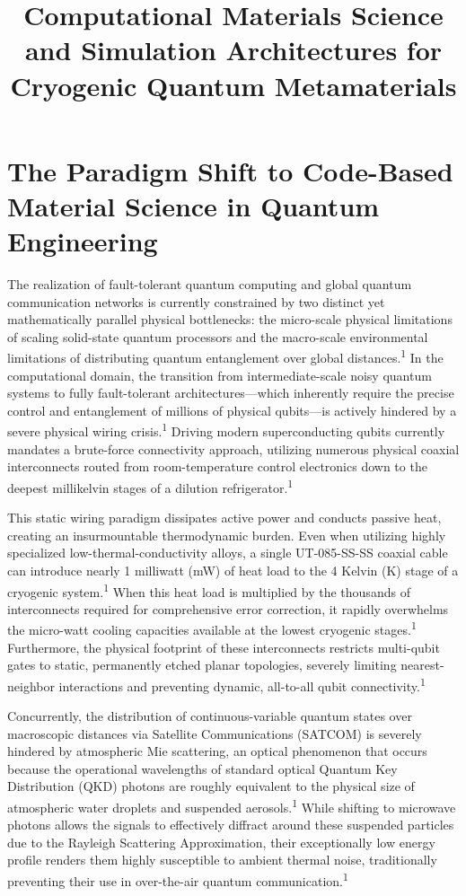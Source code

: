 \documentclass[11pt, a4paper]{article}
\begin{document}
\title{\textbf{Computational Materials Science and Simulation Architectures for Cryogenic Quantum Metamaterials}}
\date{}
\maketitle

\section{The Paradigm Shift to Code-Based Material Science in Quantum Engineering}

The realization of fault-tolerant quantum computing and global quantum communication networks is currently constrained by two distinct yet mathematically parallel physical bottlenecks: the micro-scale physical limitations of scaling solid-state quantum processors and the macro-scale environmental limitations of distributing quantum entanglement over global distances.\textsuperscript{1} In the computational domain, the transition from intermediate-scale noisy quantum systems to fully fault-tolerant architectures---which inherently require the precise control and entanglement of millions of physical qubits---is actively hindered by a severe physical wiring crisis.\textsuperscript{1} Driving modern superconducting qubits currently mandates a brute-force connectivity approach, utilizing numerous physical coaxial interconnects routed from room-temperature control electronics down to the deepest millikelvin stages of a dilution refrigerator.\textsuperscript{1}

This static wiring paradigm dissipates active power and conducts passive heat, creating an insurmountable thermodynamic burden. Even when utilizing highly specialized low-thermal-conductivity alloys, a single UT-085-SS-SS coaxial cable can introduce nearly 1 milliwatt (mW) of heat load to the 4 Kelvin (K) stage of a cryogenic system.\textsuperscript{1} When this heat load is multiplied by the thousands of interconnects required for comprehensive error correction, it rapidly overwhelms the micro-watt cooling capacities available at the lowest cryogenic stages.\textsuperscript{1} Furthermore, the physical footprint of these interconnects restricts multi-qubit gates to static, permanently etched planar topologies, severely limiting nearest-neighbor interactions and preventing dynamic, all-to-all qubit connectivity.\textsuperscript{1}

Concurrently, the distribution of continuous-variable quantum states over macroscopic distances via Satellite Communications (SATCOM) is severely hindered by atmospheric Mie scattering, an optical phenomenon that occurs because the operational wavelengths of standard optical Quantum Key Distribution (QKD) photons are roughly equivalent to the physical size of atmospheric water droplets and suspended aerosols.\textsuperscript{1} While shifting to microwave photons allows the signals to effectively diffract around these suspended particles due to the Rayleigh Scattering Approximation, their exceptionally low energy profile renders them highly susceptible to ambient thermal noise, traditionally preventing their use in over-the-air quantum communication.\textsuperscript{1}
\end{document}
